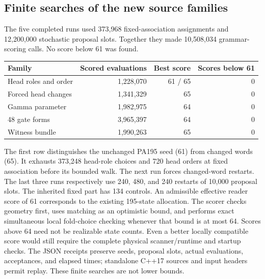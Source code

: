 \subsection{Finite searches of the new source families}
The five completed runs used 373,968 fixed-association assignments and 12,200,000 stochastic proposal slots. Together they made 10,508,034 grammar-scoring calls. No score below 61 was found.
\begin{center}
\small
\begin{tabular}{lrrr}
\toprule
Family & Scored evaluations & Best score & Scores below 61\\
\midrule
Head roles and order & 1,228,070 & 61 / 65 & 0\\
Forced head changes & 1,341,329 & 65 & 0\\
Gamma parameter & 1,982,975 & 64 & 0\\
48 gate forms & 3,965,397 & 64 & 0\\
Witness bundle & 1,990,263 & 65 & 0\\
\bottomrule
\end{tabular}
\end{center}
The first row distinguishes the unchanged PA195 seed (61) from changed words (65). It exhausts 373,248 head-role choices and 720 head orders at fixed association before its bounded walk. The next run forces changed-word restarts. The last three runs respectively use 240, 480, and 240 restarts of 10,000 proposal slots.
The inherited fixed part has 134 controls. An admissible effective reader score of 61 corresponds to the existing 195-state allocation. The scorer checks geometry first, uses matching as an optimistic bound, and performs exact simultaneous local fold-choice checking whenever that bound is at most 64. Scores above 64 need not be realizable state counts. Even a better locally compatible score would still require the complete physical scanner/runtime and startup checks. The JSON receipts preserve seeds, proposal slots, actual evaluations, acceptances, and elapsed times; standalone C++17 sources and input headers permit replay. These finite searches are not lower bounds.
